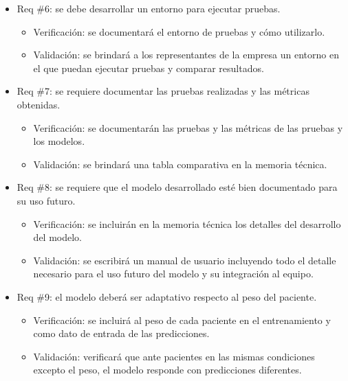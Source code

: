 \documentclass[
11pt, %
]{charter}
\begin{document}
\begin{itemize} 
	\item Req \#6: se debe desarrollar un entorno para ejecutar pruebas.
	
	\begin{itemize}
		\item Verificación: se documentará el entorno de pruebas y cómo utilizarlo.
		\item Validación: se brindará a los representantes de la empresa un entorno en el que puedan ejecutar pruebas y comparar resultados.
	\end{itemize}
	
\end{itemize}

\begin{itemize} 
	\item Req \#7: se requiere documentar las pruebas realizadas y las métricas obtenidas.
	
	\begin{itemize}
		\item Verificación: se documentarán las pruebas y las métricas de las pruebas y los modelos.
		\item Validación: se brindará una tabla comparativa en la memoria técnica.
	\end{itemize}
	
\end{itemize}

\begin{itemize} 
	\item Req \#8: se requiere que el modelo desarrollado esté bien documentado para su uso futuro.
	
	\begin{itemize}
		\item Verificación: se incluirán en la memoria técnica los detalles del desarrollo del modelo.
		\item Validación: se escribirá un manual de usuario incluyendo todo el detalle necesario para el uso futuro del modelo y su integración al equipo.
	\end{itemize}
	
\end{itemize}

\begin{itemize} 
	\item Req \#9: el modelo deberá ser adaptativo respecto al peso del paciente.
	
	\begin{itemize}
		\item Verificación: se incluirá al peso de cada paciente en el entrenamiento y como dato de entrada de las predicciones.
		\item Validación: verificará que ante pacientes en las mismas condiciones excepto el peso, el modelo responde con predicciones diferentes.
	\end{itemize}
	
\end{itemize}
\end{document}
